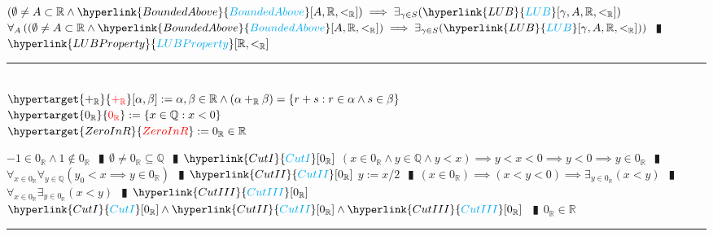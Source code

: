 \documentclass{book}
\newcommand{\df}[1]{\hypertarget{#1}{\textcolor{red}{#1}}}
\newcommand{\rf}[1]{\hyperlink{#1}{\textcolor{cyan}{#1}}}
\newcommand{\abr}{:=}
\newcommand{\pipe}{$\phantom{(}\vrectangleblack\phantom{)}$}
\newcommand{\pr}[1]{\left(#1\right)}
\begin{document}
\begin{enumerate}
\begin{enumerate}
  \end{enumerate}  
  \lit $(\emptyset \neq A \subset \mathbb{R} \land \rf{BoundedAbove}[A, \mathbb{R}, <_{\mathbb{R}}]) \implies \exists_{\gamma \in S}(\rf{LUB}[\gamma, A, \mathbb{R}, <_{\mathbb{R}}])$
  \lit $\forall_{A}\pr{(\emptyset \neq A \subset \mathbb{R} \land \rf{BoundedAbove}[A, \mathbb{R}, <_{\mathbb{R}}]) \implies \exists_{\gamma \in S}(\rf{LUB}[\gamma, A, \mathbb{R}, <_{\mathbb{R}}])}$ \pipe $\rf{LUBProperty}[\mathbb{R}, <_{\mathbb{R}}]$
\end{enumerate} \vspace{.75mm} \hrule \vspace{.75mm} \ \\

$\df{+_{\mathbb{R}}}[\alpha, \beta] \abr \alpha, \beta \in \mathbb{R} \land (\alpha +_{\mathbb{R}} \beta) = \{r + s : r \in \alpha \land s \in \beta\}$ \\
$\df{0_{\mathbb{R}}} \abr \{x \in \mathbb{Q} : x < 0\}$ \\

$\df{ZeroInR} \abr 0_{\mathbb{R}} \in \mathbb{R}$
\begin{enumerate}
  \lit $-1 \in 0_{\mathbb{R}} \land 1 \notin 0_{\mathbb{R}}$ \pipe $\emptyset \neq 0_{\mathbb{R}} \subseteq \mathbb{Q}$ \pipe $\rf{CutI}[0_{\mathbb{R}}]$
  \lit $(x \in 0_{\mathbb{R}} \land y \in \mathbb{Q} \land y < x) \implies y < x < 0 \implies y < 0 \implies y \in 0_{\mathbb{R}}$ \pipe $\forall_{x \in 0_{\mathbb{R}}} \forall_{y \in \mathbb{Q}} (y_0 < x \implies y \in 0_{\mathbb{R}})$ \pipe $\rf{CutII}[0_{\mathbb{R}}]$
  \lit $y \abr x / 2$ \pipe $(x \in 0_{\mathbb{R}}) \implies (x < y < 0) \implies \exists_{y \in 0_{\mathbb{R}}}(x < y)$ \pipe $\forall_{x \in 0_{\mathbb{R}}} \exists_{y \in 0_{\mathbb{R}}}(x < y)$ \pipe $\rf{CutIII}[0_{\mathbb{R}}]$
  \lit $\rf{CutI}[0_{\mathbb{R}}] \land \rf{CutII}[0_{\mathbb{R}}] \land \rf{CutIII}[0_{\mathbb{R}}]$ \pipe $0_{\mathbb{R}} \in \mathbb{R}$
\end{enumerate} \vspace{.75mm} \hrule \vspace{.75mm} \ \\
\end{document}
